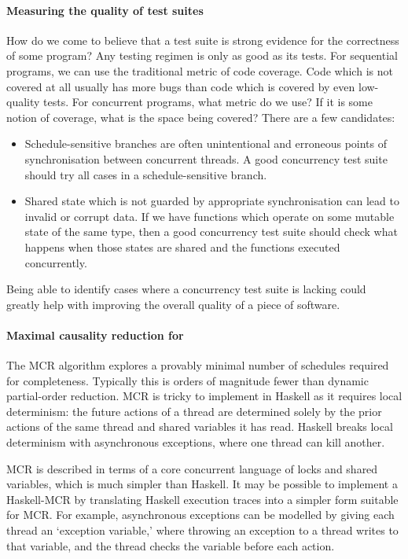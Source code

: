 \paragraph{Measuring the quality of test suites}
How do we come to believe that a test suite is strong evidence for the
correctness of some program?  Any testing regimen is only as good as
its tests.  For sequential programs, we can use the traditional metric
of code coverage.  Code which is not covered at all usually has more
bugs than code which is covered by even low-quality
tests\cite{ahmed2016}.  For concurrent programs, what metric do we
use?  If it is some notion of coverage, what is the space being
covered?  There are a few candidates:

\begin{itemize}
\item Schedule-sensitive branches are often unintentional and
  erroneous points of synchronisation between concurrent
  threads\cite{huang2015ssb}.  A good concurrency test suite should
  try all cases in a schedule-sensitive branch.

\item Shared state which is not guarded by appropriate synchronisation
  can lead to invalid or corrupt data.  If we have functions which
  operate on some mutable state of the same type, then a good
  concurrency test suite should check what happens when those states
  are shared and the functions executed concurrently.
\end{itemize}

Being able to identify cases where a concurrency test suite is lacking
could greatly help with improving the overall quality of a piece of
software.

\paragraph{Maximal causality reduction for \dejafu{}}
The MCR algorithm\cite{huang2015} explores a provably minimal number
of schedules required for completeness.  Typically this is orders of
magnitude fewer than dynamic partial-order reduction.  MCR is tricky
to implement in Haskell as it requires local determinism: the future
actions of a thread are determined solely by the prior actions of the
same thread and shared variables it has read.  Haskell breaks local
determinism with asynchronous exceptions, where one thread can kill
another.

MCR is described in terms of a core concurrent language of locks and
shared variables, which is much simpler than Haskell.  It may be
possible to implement a Haskell-MCR by translating Haskell execution
traces into a simpler form suitable for MCR\@.  For example,
asynchronous exceptions can be modelled by giving each thread an
`exception variable,' where throwing an exception to a thread writes
to that variable, and the thread checks the variable before each
action.

